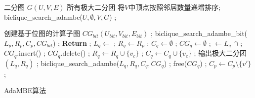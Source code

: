 






\begin{algorithm} [H]
  \begin{algorithmic}[1]
    \normalsize

    \REQUIRE 二分图 $G(U,V,E)$
    \ENSURE 所有极大二分团
    \STATE 将$V$中顶点按照邻居数量递增排序;
    \STATE \textsf{biclique\_search\_adambe}($U, \emptyset, V, G$) ;
     
    \renewcommand{\algorithmicwhile}{\textbf{procedure}}
    \renewcommand{\algorithmicdo}{\textbf{:}}
    

        \STATE 创建基于位图的计算子图 $CG_{bit} (U_{bit}, V_{bit}, E_{bit})$ ;
        \STATE \textsf{biclique\_search\_adambe\_bit}($L_p, R_p, C_p, CG_{bit}$) ;
        \STATE \textbf{Return} ;
      \ENDIF
        \STATE $L_q \leftarrow$  ; $R_q\leftarrow R_p$ ; $C_q \leftarrow \emptyset$ ; $CG_q \leftarrow \emptyset$ ;
          \STATE {} $\leftarrow L_q$ $\cap$  ;
          \STATE $CG_q$\textsf{.insert}() ;
            \STATE $CG_q$\textsf{.delete}() ;
          \ENDIF
            \STATE $R_q \leftarrow R_q \cup \{v_c\}$ ;
            \STATE $C_q \leftarrow C_q \cup \{v_c\}$ ;
          \ENDIF
        \ENDFOR
          \STATE 输出极大二分团 $(L_q, R_q)$ ;
          \STATE \textsf{biclique\_search\_adambe}($L_q, R_q, C_q, CG_q$) ;
        \ENDIF
        \STATE \textsf{free}($CG_q$) ; $C_p \leftarrow C_p \setminus \{v'\} $;
      \ENDFOR
    \ENDWHILE 
  
  \end{algorithmic}
  \caption{AdaMBE算法}
  \label{alg:adambe}
\end{algorithm}



